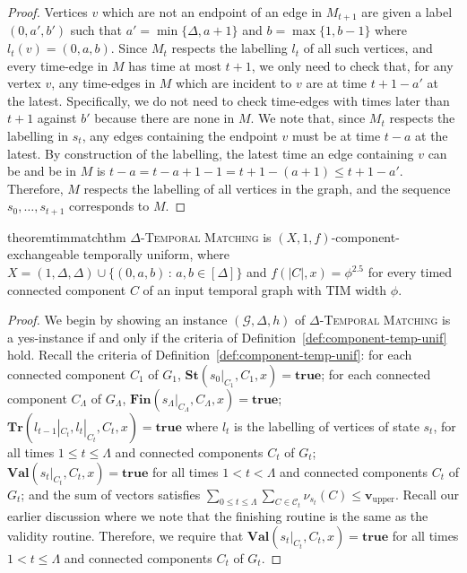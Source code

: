 \documentclass[a4paper,UKenglish,cleveref, autoref, thm-restate]{lipics-v2021} %
\begin{document}
\begin{toappendix}
\begin{proof}
   Vertices $v$ which are not an endpoint of an edge in $M_{t+1}$ are given a label $(0,a',b')$ such that $a'=\min\{\Delta,a+1\}$ and $b=\max\{1,b-1\}$ where $l_t(v)=(0,a,b)$. Since $M_t$ respects the labelling $l_t$ of all such vertices, and every time-edge in $M$ has time at most $t+1$, we only need to check that, for any vertex $v$, any time-edges in $M$ which are incident to $v$ are at time $t+1-a'$ at the latest. Specifically, we do not need to check time-edges with times later than $t+1$ against $b'$ because there are none in $M$. We note that, since $M_t$ respects the labelling in $s_t$, any edges containing the endpoint $v$ must be at time $t-a$ at the latest. By construction of the labelling, the latest time an edge containing $v$ can be and be in $M$ is $t-a=t-a+1-1=t+1-(a+1)\leq t+1-a'$. Therefore, $M$ respects the labelling of all vertices in the graph, and the sequence $s_0,\ldots,s_{t+1}$ corresponds to $M$.
\end{proof}
\begin{restatable}{theorem}{timmatchthm}
     \textsc{$\Delta$-Temporal Matching} is $(X,1,f)$-component-exchangeable temporally uniform, where $X=(1,\Delta,\Delta)\cup \{(0,a,b)\,:\, a,b\in [\Delta]\}$
     and $f(|C|,x)=\phi^{2.5}$ for every timed connected component $C$ of an input temporal graph with TIM width $\phi$.
\end{restatable}
\begin{proof}
    We begin by showing an instance $(\mathcal{G},\Delta,h)$ of \textsc{$\Delta$-Temporal Matching} is a yes-instance if and only if the criteria of Definition~\ref{def:component-temp-unif} hold.  Recall the criteria of Definition~\ref{def:component-temp-unif}: for each connected component $C_1$ of $G_1$, $\textbf{St}(s_0|_{C_1},C_1,x)=\textbf{true}$; for each connected component $C_{\Lambda}$ of $G_{\Lambda}$, $\textbf{Fin}(s_{\Lambda}|_{C_{\Lambda}},C_{\Lambda},x)=\textbf{true}$; $\textbf{Tr}(l_{t-1}|_{C_t}, l_t|_{C_t}, C_t,x)=\textbf{true}$ where $l_t$ is the labelling of vertices of state $s_t$, for all times $1 \leq t \leq \Lambda$ and connected components $C_t$ of $G_t$; $\textbf{Val}(s_t|_{C_t}, C_t,x)=\textbf{true}$ for all times $1 < t < \Lambda$ and connected components $C_t$ of $G_t$; and the sum of vectors satisfies $\sum_{0\leq t\leq \Lambda} \sum_{C \in\mathcal{C}_t}\nu_{s_t} (C)\leq \textbf{v}_{\text{upper}}$. Recall our earlier discussion where we note that the finishing routine is the same as the validity routine. Therefore, we require that $\textbf{Val}(s_t|_{C_t}, C_t,x)=\textbf{true}$ for all times $1 < t \leq \Lambda$ and connected components $C_t$ of $G_t$.


\end{proof}
\end{toappendix}
\end{document}
